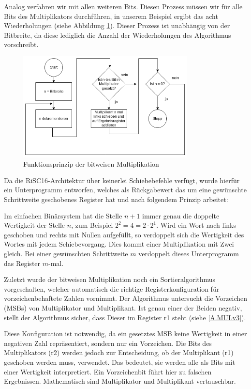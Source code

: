 \documentclass[fleqn, a4paper, 11pt]{article}       %
\begin{document}
Analog verfahren wir mit allen weiteren Bits. Diesen Prozess müssen wir für alle Bits des Multiplikators durchführen, in unserem Beispiel ergibt das acht Wiederholungen (siehe Abbildung \ref{fig:bitw_Mul_Prinzip}). Dieser Prozess ist unabhängig von der Bitbreite, da diese lediglich die Anzahl der Wiederholungen des Algorithmus vorschreibt.



\begin{figure}[h]
    \includegraphics[width =0.8\textwidth]{bitweise_Mul_Prinzip.png}
\caption{Funktionsprinzip der bitweisen Multiplikation}
\label{fig:bitw_Mul_Prinzip}
\end{figure}



Da die RiSC16-Architektur über keinerlei Schiebebefehle verfügt, wurde hierfür ein Unterprogramm entworfen, welches als Rückgabewert das um eine gewünschte Schrittweite geschobenes Register hat und nach folgendem Prinzip arbeitet:

Im einfachen Binärsystem hat die Stelle $n+1$ immer genau die doppelte Wertigkeit der Stelle $n$, zum Beispiel $2^2 = 4 = 2 \cdot 2^1$. Wird ein Wort nach links geschoben und  rechts mit Nullen aufgefüllt, so verdoppelt sich die Wertigkeit des Wortes mit jedem Schiebevorgang. Dies kommt einer Multiplikation mit Zwei gleich. Bei einer gewünschten Schrittweite $m$ verdoppelt dieses Unterprogramm das Register  $m$-mal.

Zuletzt wurde der bitweisen Multiplikation noch ein Sortieralgorithmus vorgeschalten, welcher automatisch die richtige Registerkonfiguration für vorzeichenbehaftete Zahlen vornimmt. Der Algorithmus untersucht die Vorzeichen (MSBs) von Multiplikator und Multiplikant. Ist genau einer der Beiden negativ, stellt der Algorithmus sicher, dass Dieser im Register r1 steht (siehe \ref{A.MULv3}). 

Diese Konfiguration ist notwendig, da ein gesetztes MSB keine Wertigkeit in einer negativen  Zahl repräsentiert, sondern nur ein Vorzeichen. Die Bits des Multiplikators (r2) werden jedoch zur Entscheidung, ob der Multiplikant (r1) geschoben werden muss, verwendet. Das bedeutet, sie werden alle als Bits mit einer Wertigkeit interpretiert. Ein Vorzeichenbit führt hier zu falschen Ergebnissen. Mathematisch sind Multiplikator und Multiplikant vertauschbar.
\end{document}
